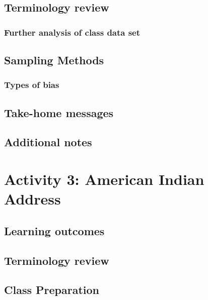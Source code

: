 \documentclass[
]{report}
\begin{document}
\subsection{Terminology review}\label{terminology-review-1}

\subsubsection*{Further analysis of class data set}\label{further-analysis-of-class-data-set}

\subsection{Sampling Methods}\label{sampling-methods}

\subsubsection*{Types of bias}\label{types-of-bias}

\subsection{Take-home messages}\label{take-home-messages-1}

\subsection{Additional notes}\label{additional-notes-1}

\section{Activity 3: American Indian Address}\label{activity-3-american-indian-address}

\subsection{Learning outcomes}\label{learning-outcomes-2}

\subsection{Terminology review}\label{terminology-review-2}

\subsection{Class Preparation}\label{class-preparation}
\end{document}
